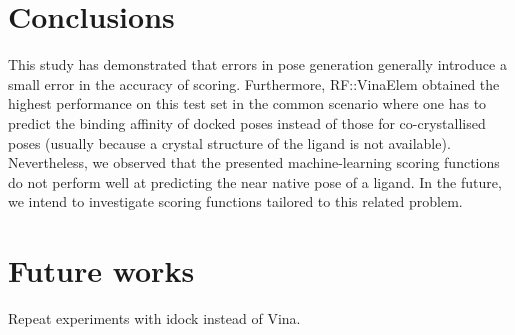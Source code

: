 \section{Conclusions}

This study has demonstrated that errors in pose generation generally introduce a small error in the accuracy of scoring. Furthermore, RF::VinaElem obtained the highest performance on this test set in the common scenario where one has to predict the binding affinity of docked poses instead of those for co-crystallised poses (usually because a crystal structure of the ligand is not available). Nevertheless, we observed that the presented machine-learning scoring functions do not perform well at predicting the near native pose of a ligand. In the future, we intend to investigate scoring functions tailored to this related problem.

\section{Future works}

Repeat experiments with idock instead of Vina.

\chapterend
